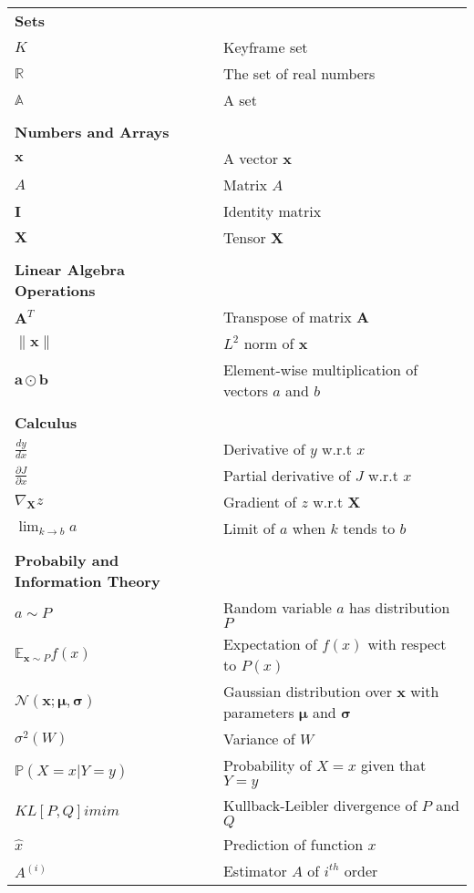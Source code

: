 \begin{longtable}{ll}
{\bf Sets} \\
$K$ & Keyframe set \\
$\mathbb{R}$ & The set of real numbers \\
$\mathbb{A}$ & A set \\
\\
{\bf Numbers and Arrays} \\
$\boldsymbol{x}$ & A vector $\boldsymbol{x}$ \\
$A$ & Matrix $A$ \\
$\boldsymbol{I}$ & Identity matrix \\
$\boldsymbol{X}$ & Tensor $\boldsymbol{X}$ \\
\\

{\bf Linear Algebra Operations} \\
$\boldsymbol{A}^{T}$ & Transpose of matrix $\boldsymbol{A}$ \\
$\lVert \boldsymbol{x} \rVert$ & $L^{2}$ norm of $\boldsymbol{x}$ \\
$\boldsymbol{a} \odot \boldsymbol{b}$ & Element-wise multiplication of vectors $a$ and $b$ \\

\\

{\bf Calculus} \\
$\frac{dy}{dx}$ & Derivative of $y$ w.r.t $x$ \\
$\frac{\partial{J}}{\partial{x}}$ & Partial derivative of $J$ w.r.t $x$ \\
$\nabla_{\boldsymbol{X}}z$ & Gradient of $z$ w.r.t $\boldsymbol{X}$ \\
$\lim_{k \rightarrow b} a$ & Limit of $a$ when $k$ tends to $b$ \\

\\

{\bf Probabily and Information Theory} \\
$a \sim P$ & Random variable $a$ has distribution $P$ \\
$\mathbb{E}_{\mathrm{\mathbf{x}}\sim P}f(x)$ & Expectation of $f(x)$ with respect to $P(x)$ \\
$\mathcal{N}(\boldsymbol{x}; \boldsymbol{\mu}, \boldsymbol{\sigma})$ & Gaussian distribution over
$\boldsymbol{x}$ with parameters $\boldsymbol{\mu}$ and $\boldsymbol{\sigma}$ \\
$\sigma^{2}(W)$ & Variance of $W$ \\
$\mathbb{P}(X = x| Y = y)$ & Probability of $X = x$ given that $Y = y$ \\
$KL[P,Q]imim$ & Kullback-Leibler divergence of $P$ and $Q$\\
$\hat{x}$ & Prediction of function $x$ \\
$A^{(i)}$ & Estimator $A$ of $i^{th}$ order \\



\end{longtable}

